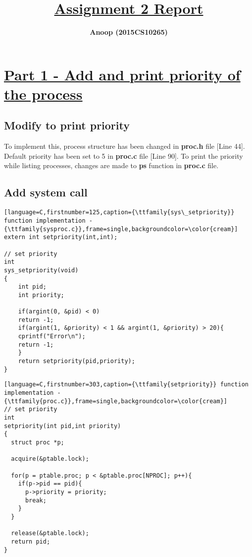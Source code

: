 \documentclass[12pt]{article}
\title{\underline{\textbf{Assignment 2 Report}}}
\author{\textbf{Anoop (2015CS10265)}}
\begin{document}
\maketitle

\section*{\underline{Part 1 - Add and print priority of the process}}
\subsection*{Modify {} to print priority}
\begin{addmargin}[0.3in]{0in}
    To implement this, process structure has been changed in \textbf{proc.h} file [Line 44]. Default priority has been set to 5 in \textbf{proc.c} file [Line 90]. To print the priority while listing processes, changes are made to \textbf{ps} function in \textbf{proc.c} file.
\end{addmargin}

\subsection*{Add {} system call}
\begin{addmargin}[0.3in]{0in}
\begin{lstlisting}[language=C,firstnumber=125,caption={\ttfamily{sys\_setpriority}} function implementation - {\ttfamily{sysproc.c}},frame=single,backgroundcolor=\color{cream}]
extern int setpriority(int,int);

// set priority
int
sys_setpriority(void)
{
    int pid;
    int priority;

    if(argint(0, &pid) < 0)
    return -1;
    if(argint(1, &priority) < 1 && argint(1, &priority) > 20){
    cprintf("Error\n");
    return -1;
    }
    return setpriority(pid,priority);
}
\end{lstlisting}
\begin{lstlisting}[language=C,firstnumber=303,caption={\ttfamily{setpriority}} function implementation - {\ttfamily{proc.c}},frame=single,backgroundcolor=\color{cream}]
// set priority
int
setpriority(int pid,int priority)
{
  struct proc *p;
  
  acquire(&ptable.lock);

  for(p = ptable.proc; p < &ptable.proc[NPROC]; p++){
    if(p->pid == pid){
      p->priority = priority;
      break;
    }
  }

  release(&ptable.lock);
  return pid;
}
\end{lstlisting}
\end{addmargin}
\end{document}
